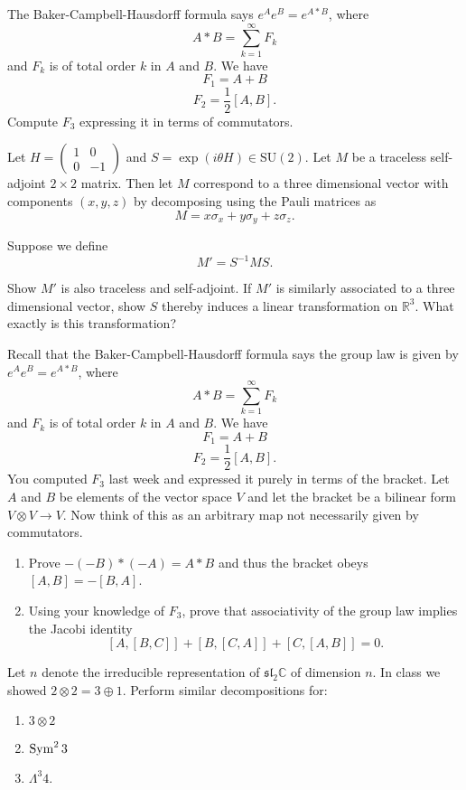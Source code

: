   \begin{exercise} 
    The Baker-Campbell-Hausdorff formula says $e^A e^B = e^{A*B}$, where
    \[A * B = \sum_{k=1}^{\infty} F_k\]
    and $F_k$ is of total order $k$ in $A$ and $B$. We have
    \[F_1 = A+B\]
    \[F_2 = \frac{1}{2}[A,B].\]
    Compute $F_3$ expressing it in terms of commutators.
  \end{exercise}

  \begin{exercise} 
    Let $H = \begin{pmatrix} 1 & 0 \\ 0 & -1 \end{pmatrix}$ and $S = \exp(i\theta H) \in \text{SU}(2)$. Let $M$ be a traceless self-adjoint $2 \times 2$ matrix. Then let $M$ correspond to a three dimensional vector with components $(x, y, z)$ by decomposing using the Pauli matrices as
    \[M = x\sigma_x + y\sigma_y + z\sigma_z.\]
    
    Suppose we define
    \[M' = S^{-1}MS.\]
    
    Show $M'$ is also traceless and self-adjoint. If $M'$ is similarly associated to a three dimensional vector, show $S$ thereby induces a linear transformation on $\mathbb{R}^3$. What exactly is this transformation?
  \end{exercise}

  \begin{exercise} 
    Recall that the Baker-Campbell-Hausdorff formula says the group law is given by $e^A e^B = e^{A*B}$, where
    \[A*B = \sum_{k=1}^{\infty} F_k\]
    and $F_k$ is of total order $k$ in $A$ and $B$. We have
    \[F_1 = A+B\]
    \[F_2 = \frac{1}{2}[A,B].\]
    You computed $F_3$ last week and expressed it purely in terms of the bracket. Let $A$ and $B$ be elements of the vector space $V$ and let the bracket be a bilinear form $V \otimes V \to V$. Now think of this as an arbitrary map not necessarily given by commutators.
    \begin{enumerate}
      \item Prove $-(-B)*(-A) = A*B$ and thus the bracket obeys $[A,B] = -[B,A]$.
      \item Using your knowledge of $F_3$, prove that associativity of the group law implies the Jacobi identity
      \[[A,[B,C]]+[B,[C,A]]+[C,[A,B]]=0.\]
    \end{enumerate}
  \end{exercise}

  \begin{exercise} 
    Let $n$ denote the irreducible representation of $\mathfrak{sl}_2\mathbb{C}$ of dimension $n$. In class we showed $2 \otimes 2 = 3 \oplus 1$. Perform similar decompositions for:
    \begin{enumerate}
      \item $3 \otimes 2$ 
      \item $\Sym^2 3$ 
      \item $\Lambda^3 4$. 
    \end{enumerate}
  \end{exercise}
